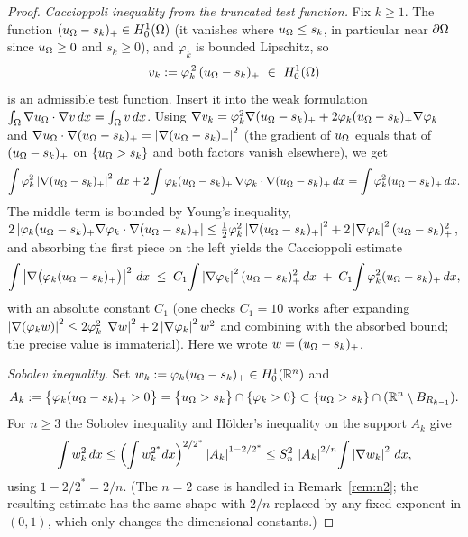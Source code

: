 \begin{proof}
\smallskip
\emph{Caccioppoli inequality from the truncated test function.}
Fix $k\ge1$. The function $(u_\Omega-s_k)_+\in H^1_0(\Omega)$ (it vanishes
where $u_\Omega\le s_k$, in particular near $\partial\Omega$ since $u_\Omega\ge0$
and $s_k\ge0$), and $\varphi_k$ is bounded Lipschitz, so
\[
   v_k:=\varphi_k^{\,2}\,(u_\Om-s_k)_+\ \in\ H^1_0(\Om)
\]
is an admissible test function. Insert it into the weak formulation
$\int_\Omega\nabla u_\Omega\cdot\nabla v\,dx=\int_\Omega v\,dx$. Using
$\nabla v_k=\varphi_k^2\nabla(u_\Omega-s_k)_+
+2\varphi_k(u_\Omega-s_k)_+\nabla\varphi_k$ and
$\nabla u_\Omega\cdot\nabla(u_\Omega-s_k)_+=\left|\nabla(u_\Omega-s_k)_+\right|^2$ (the
gradient of $u_\Omega$ equals that of $(u_\Omega-s_k)_+$ on $\{u_\Omega>s_k\}$ and
both factors vanish elsewhere), we get
\[
   \int\varphi_k^2\left|\nabla(u_\Omega-s_k)_+\right|^2\,dx
   +2\int\varphi_k(u_\Omega-s_k)_+\,\nabla\varphi_k\cdot\nabla(u_\Omega-s_k)_+\,dx
   =\int\varphi_k^2(u_\Omega-s_k)_+\,dx .
\]
The middle term is bounded by Young's inequality,
$2\left|\varphi_k(u_\Omega-s_k)_+\nabla\varphi_k\cdot\nabla(u_\Omega-s_k)_+\right|
\le\tfrac12\varphi_k^2\left|\nabla(u_\Omega-s_k)_+\right|^2
+2\left|\nabla\varphi_k\right|^2(u_\Omega-s_k)_+^2$,
and absorbing the first piece on the left yields the Caccioppoli
estimate
\begin{equation}\label{eq:caccioppoli}
   \int\left|\nabla\bigl(\varphi_k(u_\Omega-s_k)_+\bigr)\right|^2\,dx
   \;\le\;C_1\!\int\left|\nabla\varphi_k\right|^2(u_\Omega-s_k)_+^2\,dx
        \;+\;C_1\!\int\varphi_k^2(u_\Omega-s_k)_+\,dx,
\end{equation}
with an absolute constant $C_1$ (one checks $C_1=10$ works after expanding
$\left|\nabla(\varphi_k w)\right|^2\le2\varphi_k^2\left|\nabla w\right|^2
+2\left|\nabla\varphi_k\right|^2 w^2$ and combining with the absorbed bound; the
precise value is immaterial). Here we wrote $w=(u_\Omega-s_k)_+$.

\smallskip
\emph{Sobolev inequality.} Set
$w_k:=\varphi_k(u_\Omega-s_k)_+\in H^1_0(\mathbb R^n)$ and
\[
   A_k:=\bigl\{\varphi_k(u_\Omega-s_k)_+>0\bigr\}
       =\bigl\{u_\Omega>s_k\bigr\}\cap\{\varphi_k>0\}
       \subset\{u_\Omega>s_k\}\cap(\mathbb R^n\setminus B_{R_{k-1}}).
\]
For $n\ge3$ the Sobolev inequality and Hölder's inequality on the support
$A_k$ give
\begin{equation}\label{eq:sobolev}
   \int w_k^2\,dx
   \le\Bigl(\int w_k^{2^*}dx\Bigr)^{2/2^*}\left|A_k\right|^{1-2/2^*}
   \le S_n^2\,\left|A_k\right|^{2/n}\!\int\left|\nabla w_k\right|^2\,dx,
\end{equation}
using $1-2/2^*=2/n$. (The $n=2$ case is handled in
Remark~\ref{rem:n2}; the resulting estimate has the same shape with $2/n$
replaced by any fixed exponent in $(0,1)$, which only changes the
dimensional constants.)


\end{proof}
